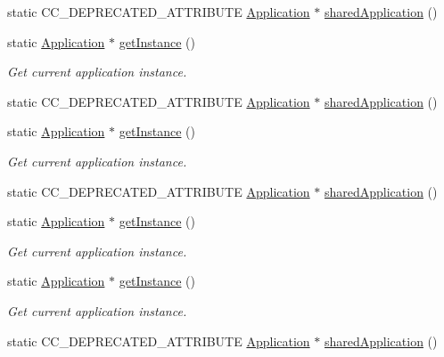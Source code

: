\begin{DoxyCompactItemize}
static C\+C\+\_\+\+D\+E\+P\+R\+E\+C\+A\+T\+E\+D\+\_\+\+A\+T\+T\+R\+I\+B\+U\+TE \hyperlink{classApplication}{Application} $\ast$ \hyperlink{classApplication_a13774a693274456e734b221cea01628c}{shared\+Application} ()
\item 
static \hyperlink{classApplication}{Application} $\ast$ \hyperlink{classApplication_ab5dba709d2e806d5d83c297bab6cdace}{get\+Instance} ()
\begin{DoxyCompactList}\small\item\em Get current application instance. \end{DoxyCompactList}\item 
static C\+C\+\_\+\+D\+E\+P\+R\+E\+C\+A\+T\+E\+D\+\_\+\+A\+T\+T\+R\+I\+B\+U\+TE \hyperlink{classApplication}{Application} $\ast$ \hyperlink{classApplication_a13774a693274456e734b221cea01628c}{shared\+Application} ()
\item 
static \hyperlink{classApplication}{Application} $\ast$ \hyperlink{classApplication_ab5dba709d2e806d5d83c297bab6cdace}{get\+Instance} ()
\begin{DoxyCompactList}\small\item\em Get current application instance. \end{DoxyCompactList}\item 
static C\+C\+\_\+\+D\+E\+P\+R\+E\+C\+A\+T\+E\+D\+\_\+\+A\+T\+T\+R\+I\+B\+U\+TE \hyperlink{classApplication}{Application} $\ast$ \hyperlink{classApplication_a13774a693274456e734b221cea01628c}{shared\+Application} ()
\item 
static \hyperlink{classApplication}{Application} $\ast$ \hyperlink{classApplication_ab5dba709d2e806d5d83c297bab6cdace}{get\+Instance} ()
\begin{DoxyCompactList}\small\item\em Get current application instance. \end{DoxyCompactList}\item 
static \hyperlink{classApplication}{Application} $\ast$ \hyperlink{classApplication_ab5dba709d2e806d5d83c297bab6cdace}{get\+Instance} ()
\begin{DoxyCompactList}\small\item\em Get current application instance. \end{DoxyCompactList}\item 
static C\+C\+\_\+\+D\+E\+P\+R\+E\+C\+A\+T\+E\+D\+\_\+\+A\+T\+T\+R\+I\+B\+U\+TE \hyperlink{classApplication}{Application} $\ast$ \hyperlink{classApplication_a13774a693274456e734b221cea01628c}{shared\+Application} ()
\item 

\end{DoxyCompactItemize}
